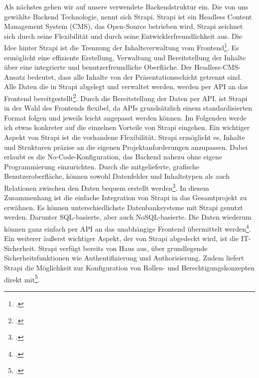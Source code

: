 Als nächstes gehen wir auf unsere verwendete Backendstruktur ein. Die von uns gewählte Backend Technologie, nennt sich Strapi.
Strapi ist ein Headless Content Management System (CMS), das Open-Source betrieben wird. Strapi zeichnet sich durch seine Flexibilität und durch seine Entwicklerfreundlichkeit aus. Die Idee hinter Strapi ist die Trennung der Inhaltsverwaltung vom Frontend\footcite{autor_strapi_2024}.
Es ermöglicht eine effiziente Erstellung, Verwaltung und Bereitstellung der Inhalte über eine integrierte und benutzerfreundliche Oberfläche. Der Headless-CMS-Ansatz bedeutet, dass alle Inhalte von der Präsentationsschicht getrennt sind. Alle Daten die in Strapi abgelegt und verwaltet werden, werden per API an das Frontend bereitgestellt\footcite{autor_headless-cms_nodate}.
Durch die Bereitstellung der Daten per API, ist Strapi in der Wahl des Frontends flexibel, da APIs grundsätzlich einem standardisierten Format folgen und jeweils leicht angepasst werden können. 
Im Folgenden werde ich etwas konkreter auf die einzelnen Vorteile von Strapi eingehen.
Ein wichtiger Aspekt von Strapi ist die vorhandene Flexibilität. Strapi ermöglicht es, Inhalte und Strukturen präzise an die eigenen Projektanforderungen anzupassen. Dabei erlaubt es die No-Code-Konfiguration, das Backend nahezu ohne eigene Programmierung einzurichten. Durch die mitgelieferte, grafische Benutzeroberfläche, können sowohl Datenfelder und Inhaltstypen als auch Relationen zwischen den Daten bequem erstellt werden\footcite{autor_headless-cms_nodate}.
In diesem Zusammenhang ist die einfache Integration von Strapi in das Gesamtprojekt zu erwähnen. Es können unterschiedlichste Datenbanksysteme mit Strapi genutzt werden. Darunter SQL-basierte, aber auch NoSQL-basierte. Die Daten wiederum können ganz einfach per API an das unabhängige Frontend übermittelt werden\footcite{autor_strapi_nodate}.
Ein weiterer äußerst wichtiger Aspekt, der von Strapi abgedeckt wird, ist die IT-Sicherheit. Strapi verfügt bereits von Haus aus, über grundlegende Sicherheitsfunktionen wie Authentifizierung und Authorisierung. Zudem liefert Strapi die Möglichkeit zur Konfiguration von Rollen- und Berechtigungskonzepten direkt mit\footcite{autor_basics_nodate}.